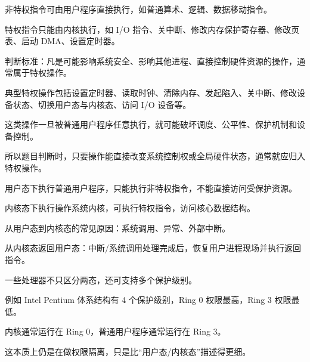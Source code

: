 \begin{points}
  \item 非特权指令可由用户程序直接执行，如普通算术、逻辑、数据移动指令。
  \item 特权指令只能由内核执行，如 I/O 指令、关中断、修改内存保护寄存器、修改页表、启动 DMA、设置定时器。
  \item 判断标准：凡是可能影响系统安全、影响其他进程、直接控制硬件资源的操作，通常属于特权操作。
\end{points}


\begin{points}
  \item 典型特权操作包括设置定时器、读取时钟、清除内存、发起陷入、关中断、修改设备状态、切换用户态与内核态、访问 I/O 设备等。
  \item 这类操作一旦被普通用户程序任意执行，就可能破坏调度、公平性、保护机制和设备控制。
  \item 所以题目判断时，只要操作能直接改变系统控制权或全局硬件状态，通常就应归入特权操作。
\end{points}


\begin{points}
  \item 用户态下执行普通用户程序，只能执行非特权指令，不能直接访问受保护资源。
  \item 内核态下执行操作系统内核，可执行特权指令，访问核心数据结构。
  \item 从用户态到内核态的常见原因：系统调用、异常、外部中断。
  \item 从内核态返回用户态：中断/系统调用处理完成后，恢复用户进程现场并执行返回指令。
\end{points}


\begin{points}
  \item 一些处理器不只区分两态，还可支持多个保护级别。
  \item 例如 Intel Pentium 体系结构有 4 个保护级别，Ring 0 权限最高，Ring 3 权限最低。
  \item 内核通常运行在 Ring 0，普通用户程序通常运行在 Ring 3。
  \item 这本质上仍是在做权限隔离，只是比“用户态/内核态”描述得更细。
\end{points}


